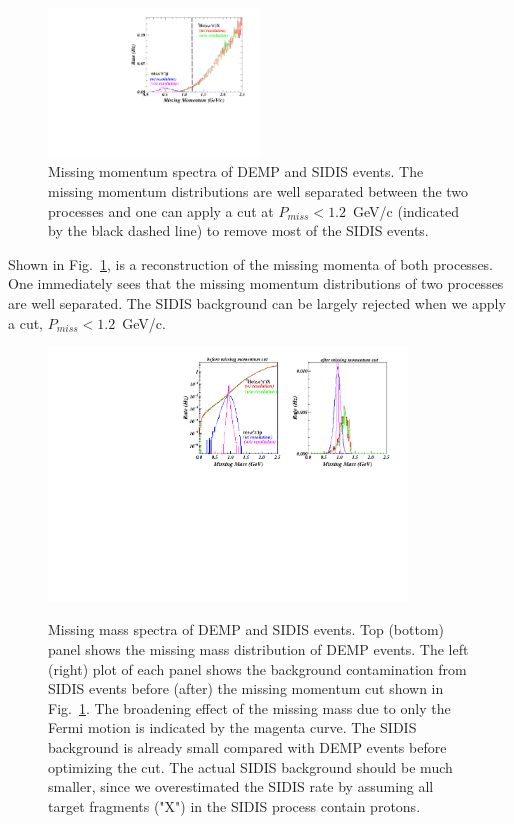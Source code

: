 \begin{figure}[!ht]
\begin{center}
\includegraphics[type=pdf,ext=.pdf,read=.pdf,width=0.5\textwidth]{./figures/Missing_P_Fermi}
\caption[Missing Momentum]{\footnotesize{Missing momentum spectra of DEMP
and SIDIS events. The missing momentum distributions are well separated between
the two processes and one can apply a cut at $P_{miss}<1.2$~GeV/c (indicated by the
black dashed line) to remove most of the SIDIS events.}}
  \label{missing_mom}
  \end{center}
\end{figure}

Shown in Fig.~\ref{missing_mom}, is a reconstruction of the missing momenta of
both processes. One immediately sees that the missing momentum distributions of
two processes are well separated. The SIDIS background can be largely rejected
when we apply a cut, $P_{miss}<1.2$~GeV/c.

\begin{figure}[!ht]
 \begin{center}
      \includegraphics[type=pdf,
        ext=.pdf,read=.pdf,width=0.85\textwidth]{./figures/Missing_Mass_Fermi} \\
   \caption[Missing Mass]{\footnotesize{Missing mass spectra of DEMP and SIDIS
events. Top (bottom) panel shows the missing mass distribution of DEMP events. 
 The left (right) plot of each panel 
shows the background contamination from SIDIS events before (after) the
missing momentum cut shown in Fig.~\ref{missing_mom}. The broadening effect of
the missing mass due to only the Fermi motion is indicated by the magenta
curve. The SIDIS background is already small compared with DEMP events before
optimizing the cut. The actual SIDIS background should be much smaller, since
we overestimated the SIDIS rate by assuming all target fragments ("X") in the
SIDIS process contain protons.}}
  \label{missing_mass}
  \end{center}
\end{figure}

